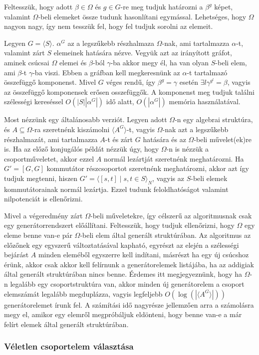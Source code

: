 Feltesszük, hogy adott $\beta\in\Omega$ és $g\in G$-re meg tudjuk határozni a $\beta^g$ képet, valamint $\Omega$-beli
elemeket össze tudunk hasonlítani egymással. Lehetséges, hogy $\Omega$ nagyon nagy, így nem tesszük fel, hogy fel tudjuk sorolni az elemeit.

Legyen $G=\langle S\rangle$. $\alpha^G$ az a legszűkebb részhalmaza $\Omega$-nak, ami tartalmazza $\alpha$-t, valamint zárt $S$ elemeinek hatására nézve.
Vegyük azt az irányított gráfot, aminek csúcsai $\Omega$ elemei és $\beta$-ból $\gamma$-ba akkor megy él, ha van olyan $S$-beli elem, ami $\beta$-t $\gamma$-ba viszi.
Ebben a gráfban kell megkeresnünk az $\alpha$-t tartalmazó összefüggő komponenst.
Mivel $G$ véges rendű, így $\beta^g=\gamma$ esetén $\exists l \gamma^{g^l}=\beta$, vagyis az összefüggő komponensek erősen osszefüggők.
A komponenst meg tudjuk találni szélességi kereséssel $O(|S| |\alpha^G|)$ idő alatt, $O(|\alpha^G|)$ memória használatával.

Most nézzünk egy általánosabb verziót.
Legyen adott $\Omega$-n egy algebrai struktúra, és $A \subseteq \Omega$-ra szeretnénk kiszámolni $\langle A^G \rangle$-t, vagyis
$\Omega$-nak azt a legszűkebb részhalmazát, ami tartalmazza $A$-t és zárt $G$ hatására és az $\Omega$-beli művelet(ek)re is.
Ha az előző konjugálós példát nézzük úgy, hogy $\Omega$-n is nézzük a csoportműveletet, akkor ezzel $A$ normál lezártját szeretnénk meghatározni.
Ha $G'=[G,G]$ kommutátor részcsoportot szeretnénk meghatározni,
akkor azt így tudjuk megtenni, hiszen $G'=\langle[s,t] \mid s,t \in S\rangle_N$, vagyis az $S$-beli elemek kommutátorainak normál lezártja.
Ezzel tudunk feloldhatóságot valamint nilpotenciát is ellenőrizni.

Mivel a végeredmény zárt $\Omega$-beli műveletekre, így célszerű az algoritmusnak csak egy generátorrendszert előállítani.
Feltesszük, hogy tudjuk ellenőrizni, hogy $\Omega$ egy eleme benne van-e pár $\Omega$-beli elem által generált struktúrában.
Az algoritmus az előzőnek egy egyszerű változtatásával kapható, egyrészt az elején a szélességi bejárást $A$ minden eleméből egyszerre kell indítani,
másrészt ha egy új csúcshoz érünk, akkor csak akkor kell felírnunk a generátorelemek listájába, ha az addigiak által generált struktúrában nincs benne.
Érdemes itt megjegyeznünk, hogy ha $\Omega$-n legalább egy csoportstruktúra van, akkor minden új generátorelem a csoport elemszámát legalább megduplázza,
vagyis legfeljebb $O(\log(|\langle A^G\rangle |))$ generátorelemet írunk fel. A számítási idő nagyrésze jellemzően arra a számolásra megy el, amikor egy elemről
megpróbáljuk eldönteni, hogy benne van-e a már felírt elemek által generált struktúrában.

\subsubsection{Véletlen csoportelem választása}
\label{subsubsec:veletlen}